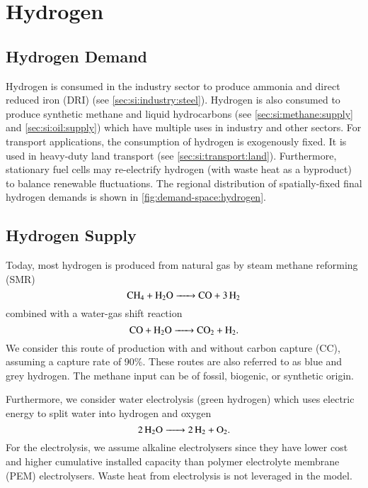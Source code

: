 \section{Hydrogen}
\label{sec:si:h2}

\subsection{Hydrogen Demand}
\label{sec:si:h2:demand}

Hydrogen is consumed in the industry sector to produce ammonia and direct
reduced iron (DRI) (see \cref{sec:si:industry:steel}). Hydrogen is also consumed
to produce synthetic methane and liquid hydrocarbons (see
\cref{sec:si:methane:supply} and \cref{sec:si:oil:supply}) which have multiple
uses in industry and other sectors. For transport applications, the consumption
of hydrogen is exogenously fixed. It is used in heavy-duty land transport (see
\cref{sec:si:transport:land}). Furthermore, stationary fuel cells may
re-electrify hydrogen (with waste heat as a byproduct) to balance renewable
fluctuations. The regional distribution of spatially-fixed final hydrogen
demands is shown in \cref{fig:demand-space:hydrogen}.

\subsection{Hydrogen Supply}
\label{sec:si:h2:supply}

Today, most hydrogen is produced from natural gas by steam methane reforming
(SMR)
\begin{equation}
    \ce{ CH4 + H2O -> CO + 3H2 }
\end{equation}
combined with a water-gas shift reaction
\begin{equation}
    \ce{CO + H2O -> CO2 + H2}.
\end{equation}
We consider this route of production with and without carbon capture (CC),
assuming a capture rate of 90\%. These routes are also referred to as blue and
grey hydrogen. The methane input can be of fossil, biogenic, or synthetic origin.

Furthermore, we consider water electrolysis (green hydrogen) which uses electric
energy to split water into hydrogen and oxygen
\begin{equation}
    \ce{2H2O -> 2 H2 + O2}.
\end{equation}
For the electrolysis, we assume alkaline electrolysers since they have lower
cost and higher cumulative installed
capacity than polymer electrolyte membrane
(PEM) electrolysers. Waste heat from electrolysis is not leveraged in the model.

